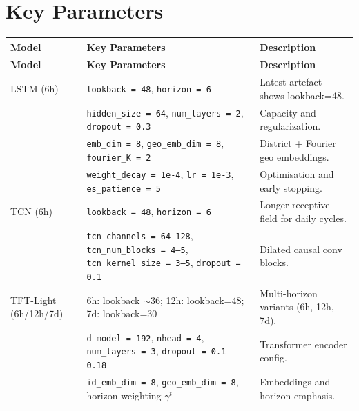 \documentclass[12pt,a4paper]{article}
\begin{document}
\section{Key Parameters}
\begin{longtable}{>{\raggedright\arraybackslash}p{2.5cm} >{\raggedright\arraybackslash}p{5.8cm} >{\raggedright\arraybackslash}p{6cm}}
\toprule
\textbf{Model} & \textbf{Key Parameters} & \textbf{Description} \\
\midrule
\endfirsthead
\toprule
\textbf{Model} & \textbf{Key Parameters} & \textbf{Description} \\
\midrule
\endhead
LSTM (6h) & \texttt{lookback = 48}, \texttt{horizon = 6} & Latest artefact shows lookback=48. \\
& \texttt{hidden\_size = 64}, \texttt{num\_layers = 2}, \texttt{dropout = 0.3} & Capacity and regularization. \\
& \texttt{emb\_dim = 8}, \texttt{geo\_emb\_dim = 8}, \texttt{fourier\_K = 2} & District + Fourier geo embeddings. \\
& \texttt{weight\_decay = 1e-4}, \texttt{lr = 1e-3}, \texttt{es\_patience = 5} & Optimisation and early stopping. \\
\midrule
TCN (6h) & \texttt{lookback = 48}, \texttt{horizon = 6} & Longer receptive field for daily cycles. \\
& \texttt{tcn\_channels = 64--128}, \texttt{tcn\_num\_blocks = 4--5}, \texttt{tcn\_kernel\_size = 3--5}, \texttt{dropout = 0.1} & Dilated causal conv blocks. \\
\midrule
TFT-Light (6h/12h/7d) & 6h: lookback $\sim$36; 12h: lookback=48; 7d: lookback=30 & Multi-horizon variants (6h, 12h, 7d). \\
& \texttt{d\_model = 192}, \texttt{nhead = 4}, \texttt{num\_layers = 3}, \texttt{dropout = 0.1--0.18} & Transformer encoder config. \\
& \texttt{id\_emb\_dim = 8}, \texttt{geo\_emb\_dim = 8}, horizon weighting $\gamma^t$ & Embeddings and horizon emphasis. \\
\bottomrule
\end{longtable}
\end{document}
